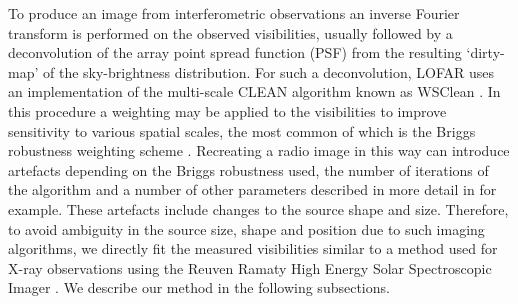 To produce an image from interferometric observations an inverse Fourier transform is performed on the observed visibilities, usually followed by a deconvolution of the array point spread function (PSF) from the resulting `dirty-map' of the sky-brightness distribution.
For such a deconvolution, LOFAR uses an implementation of the multi-scale CLEAN algorithm known as WSClean \citep{Offringa2014}. In this procedure a weighting may be applied to the visibilities to improve sensitivity to various spatial scales, the most common of which is the Briggs robustness weighting scheme \citep{Briggs1995}. Recreating a radio image in this way can introduce artefacts depending on the Briggs robustness used, the number of iterations of the algorithm and a number of other parameters described in more detail in \cite{Hogbom1974, Cornwell2008, Offringa2014, Offringa2017} for example. These artefacts include changes to the source shape and size. Therefore, to avoid ambiguity in the source size, shape and position due to such imaging algorithms, we directly fit the measured visibilities similar to a method used for X-ray observations using the Reuven Ramaty High Energy Solar Spectroscopic Imager \citep[RHESSI][]{Hurford2002, Kontar2010}. We describe our method in the following subsections. 

